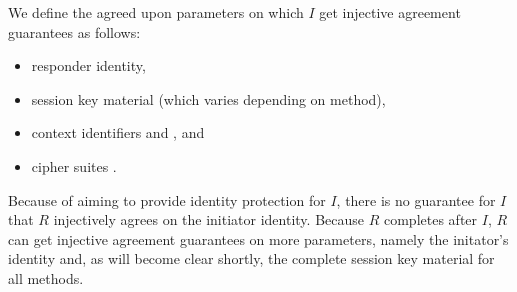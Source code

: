 We define the agreed upon parameters on which $I$ get injective agreement
guarantees as follows:
\begin{itemize}
    \item responder identity,
    \item session key material (which varies depending on \mEdhoc{} method),
    \item context identifiers \mCi{} and \mCr{}, and
    \item cipher suites \mSuites{}.
\end{itemize}
%
Because of \mEdhoc{} aiming to provide identity protection for $I$, there is no
guarantee for $I$ that $R$ injectively agrees on the initiator identity.
%
Because $R$ completes after $I$, $R$ can get injective agreement guarantees on
more parameters, namely the initator's identity and, as will become clear
shortly, the complete session key material for all methods.
%

%
%


